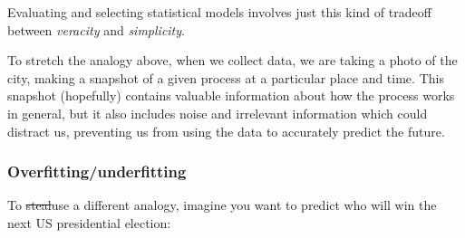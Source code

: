 \documentclass[]{article}
\theoremstyle{definition}
\theoremstyle{definition}
\theoremstyle{definition}
\theoremstyle{remark}
\begin{document}
Evaluating and selecting statistical models involves just this kind of
tradeoff between \emph{veracity} and \emph{simplicity}.

To stretch the analogy above, when we collect data, we are taking a
photo of the city, making a snapshot of a given process at a particular
place and time. This snapshot (hopefully) contains valuable information
about how the process works in general, but it also includes noise and
irrelevant information which could distract us, preventing us from using
the data to accurately predict the future.

\hypertarget{over-fitting}{\subsubsection*{Overfitting/underfitting}\label{over-fitting}}

To \sout{steal}use a different analogy, imagine you want to predict who
will win the next US presidential election:
\end{document}
